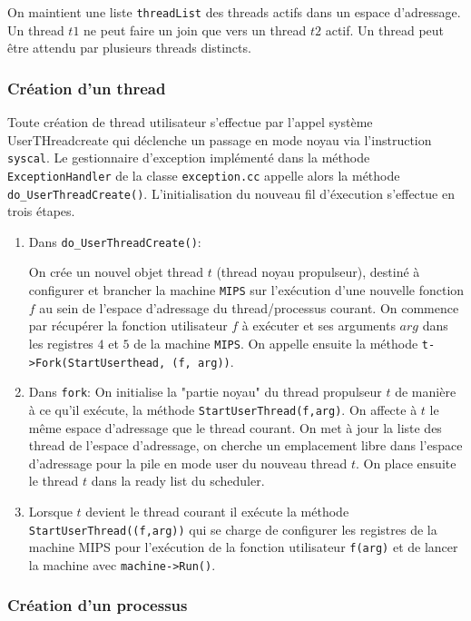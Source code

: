 \documentclass[11pt]{article}
\theoremstyle{definition}
\begin{document}
On maintient une liste \texttt{threadList} des threads actifs dans un espace d'adressage.
Un thread $t1$ ne peut faire un join que vers un thread $t2$ actif.
Un thread peut être attendu par plusieurs threads distincts.

\subsubsection{Création d'un thread}
Toute création de thread utilisateur s'effectue par l'appel système UserTHreadcreate
qui déclenche un passage en mode noyau via l'instruction \texttt{syscal}.
Le gestionnaire d'exception implémenté dans la méthode \texttt{ExceptionHandler} de la classe
\texttt{exception.cc} appelle alors la méthode \texttt{do\_UserThreadCreate()}.
L'initialisation du nouveau fil d'éxecution s'effectue en trois étapes.

\begin{enumerate}
\item Dans \texttt{do\_UserThreadCreate()}:

On crée un nouvel objet thread $t$ (thread noyau propulseur), destiné à configurer et brancher la machine \texttt{MIPS} sur l'exécution d'une nouvelle fonction $f$ au sein de l'espace d'adressage du thread/processus courant.
On commence par récupérer la fonction utilisateur $f$ à exécuter et ses arguments $arg$ dans les registres $4$ et $5$ de la machine \texttt{MIPS}. On appelle ensuite la méthode \texttt{t->Fork(StartUserthead, (f, arg))}.

\item Dans \texttt{fork}:
On initialise la "partie noyau" du thread propulseur $t$ de manière
à ce qu'il exécute, la méthode \texttt{StartUserThread(f,arg)}. On affecte à $t$ le même espace d'adressage que le thread courant. On met à jour la liste des thread de l'espace d'adressage, on cherche un emplacement
libre dans l'espace d'adressage pour la pile en mode user du nouveau thread $t$.
On place ensuite le thread $t$ dans la ready list du scheduler.

\item Lorsque $t$ devient le thread courant il exécute la méthode \texttt{StartUserThread((f,arg))}
qui se charge de configurer les registres de la machine MIPS pour l'exécution
de la fonction utilisateur \texttt{f(arg)} et de lancer la machine avec \texttt{machine->Run()}. 
\end{enumerate}

\subsubsection{Création d'un processus}
\end{document}
